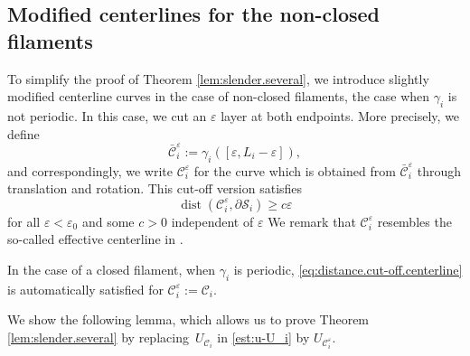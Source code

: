 \documentclass[10pt]{amsart}
\let\eps\varepsilon
\DeclareMathOperator{\dist}{dist}
\theoremstyle{definition}
\theoremstyle{remark}
\begin{document}
\subsection{Modified centerlines for the non-closed filaments}
\label{sec:non-closed}

To simplify the proof of Theorem \ref{lem:slender.several},
we introduce slightly modified centerline curves in the case of non-closed filaments, \ie the case when $\gamma_i$ is not periodic. In this case, we cut an $\eps$ layer at both endpoints. More precisely, we define
\begin{equation}
\bar {\mathcal C}_i^\eps := \gamma_i([\eps,L_i - \eps]),
\end{equation}
and correspondingly, we write $\mathcal C_i^\eps$ for the curve which is obtained from $\bar {\mathcal C}_i^\eps$ through translation and rotation.
This cut-off version satisfies
\begin{equation} \label{eq:distance.cut-off.centerline}
\dist(\mathcal C_i^\eps,\partial \mathcal S_i) \geq c \eps
\end{equation}
for all $\eps < \eps_0$ and some $c > 0$ independent of $\eps$
We remark that $\mathcal C_i^\eps$ resembles the so-called effective centerline in \cite{Mori-Ohm-free-ends}.

In the case of a closed filament, \ie when $\gamma_i$ is periodic, \eqref{eq:distance.cut-off.centerline} is automatically satisfied for $\mathcal C_i^\eps := \mathcal C_i$.

We show the following lemma, which allows us to prove Theorem \ref{lem:slender.several} by replacing~$U_{\mathcal C_i}$ in \eqref{est:u-U_i} by
$U_{\mathcal C_i^\eps}$.
\end{document}
